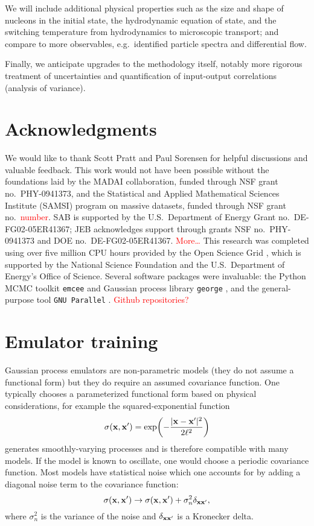 \documentclass[aps,prc,reprint,superscriptaddress,amsmath]{revtex4-1}
\newcommand{\todo}[1]{\textcolor{red}{#1}}
\begin{document}
We will include additional physical properties such as the size and shape of nucleons in the initial state, the hydrodynamic equation of state, and the switching temperature from hydrodynamics to microscopic transport; and compare to more observables, e.g.\ identified particle spectra and differential flow.

Finally, we anticipate upgrades to the methodology itself, notably more rigorous treatment of uncertainties and quantification of input-output correlations (analysis of variance).


\section*{Acknowledgments}

We would like to thank Scott Pratt and Paul Sorensen for helpful discussions and valuable feedback.
This work would not have been possible without the foundations laid by the MADAI collaboration, funded through NSF grant no.~PHY-0941373, and the Statistical and Applied Mathematical Sciences Institute (SAMSI) program on massive datasets, funded through NSF grant no.~\todo{number}.
SAB is supported by the U.S.\ Department of Energy Grant no.~DE-FG02-05ER41367; JEB acknowledges support through grants NSF no.~PHY-0941373 and DOE no.~DE-FG02-05ER41367.
\todo{More\ldots}
This research was completed using over five million CPU hours provided by the Open Science Grid \cite{Pordes:2007zzb,Sfiligoi:2010zz}, which is supported by the National Science Foundation and the U.S.\ Department of Energy's Office of Science.
Several software packages were invaluable:
the Python MCMC toolkit \texttt{emcee} \cite{FM:2013mc} and Gaussian process library \texttt{george} \cite{Ambikasaran:2014gp}, and the general-purpose tool \texttt{GNU Parallel} \cite{Tange:2011pa}.
\todo{Github repositories?}


\appendix

\section{\label{app:train}Emulator training}

\newcommand{\vectheta}{\boldsymbol\theta}

Gaussian process emulators are non-parametric models (they do not assume a functional form) but they do require an assumed covariance function.
One typically chooses a parameterized functional form based on physical considerations, for example the squared-exponential function
\begin{equation*}
  \sigma(\mathbf x, \mathbf x') = \exp\biggl( -\frac{|\mathbf x - \mathbf x'|^2}{2\ell^2} \biggr)
\end{equation*}
generates smoothly-varying processes and is therefore compatible with many models.
If the model is known to oscillate, one would choose a periodic covariance function.
Most models have statistical noise which one accounts for by adding a diagonal noise term to the covariance function:
\begin{equation*}
  \sigma(\mathbf x, \mathbf x') \rightarrow \sigma(\mathbf x, \mathbf x') + \sigma_n^2\delta_{\mathbf x\mathbf x'},
\end{equation*}
where $\sigma_n^2$ is the variance of the noise and $\delta_{\mathbf x\mathbf x'}$ is a Kronecker delta.
\end{document}
